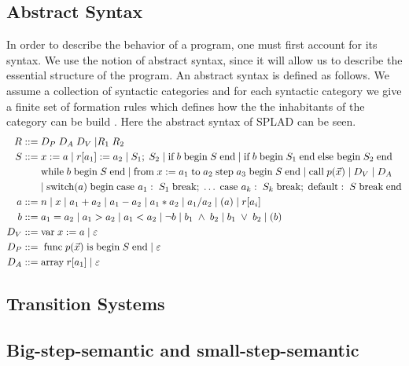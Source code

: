 \subsection{Abstract Syntax}
In order to describe the behavior of a program, one must first account for its syntax. We use the notion of abstract syntax, since it will allow us to describe the essential structure of the program. An abstract syntax is defined as follows. We assume a collection of syntactic categories and for each syntactic category we give a finite set of formation rules which defines how the the inhabitants of the category can be build \citep{HHTree}.
Here the abstract syntax of SPLAD can be seen. 
\begin{align*}
R ::= \; & D_P \; D_A \; D_V \; | R_1 \; R_2 \; \\
S::= \; & x := a \; | \; r[a_1] := a_2 \; | \; S_1; \; S_2 \; | \; \text{if} \; b \; \text{begin} \; S \; \text{end} \; | \; \text{if} \; b \; \text{begin} \; S_1 \; \text{end} \; \text{else begin} \; S_2 \; \text{end} \\
~ & \text{while} \; b \; \text{begin} \; S \; \text{end} \; | \; \text{from} \; x := a_1 \; \text{to} \; a_2 \; \text{step} \; a_3 \; \text{begin} \; S \; \text{end} \; | \; \text{call} \; p(\vec{x}) \; | \; D_V \; | \; D_A \; \\
~ & | \; \text{switch}(a) \; \text{begin} \; \text{case } a_1: \; S_1 \; \text{break}; \; \dots \; \text{case } a_k: \; S_k \; \text{break}; \; \text{default}: \; S \; \text{break} \; \text{end} \\
a::= \; & n \; | \; x \; | \; a_1 + a_2 \; | \; a_1 - a_2 \; | \; a_1 * a_2 \; | \; a_1 / a_2 \; | \; (a) \; | \; r[a_i]\\
b::= \; &a_1 = a_2 \; | \; a_1 > a_2 \; | \; a_1 < a_2 \; | \; \neg b \; | \; b_1 \; \wedge \; b_2 \; | \; b_1 \; \vee \; b_2 \; | \; (b)\\
D_V::= \; & \text{var} \; x := a \;|\; \varepsilon\\
D_P::= \; & \; \text{func} \; p(\vec{x}) \; \text{is} \; \text{begin} \; S \; \text{end}  \;|\; \varepsilon\\
D_A::= \; & \text{array} \; r[a_1]  \;|\; \varepsilon\\
\end{align*}

\subsection{Transition Systems}


\subsection{Big-step-semantic and small-step-semantic}

